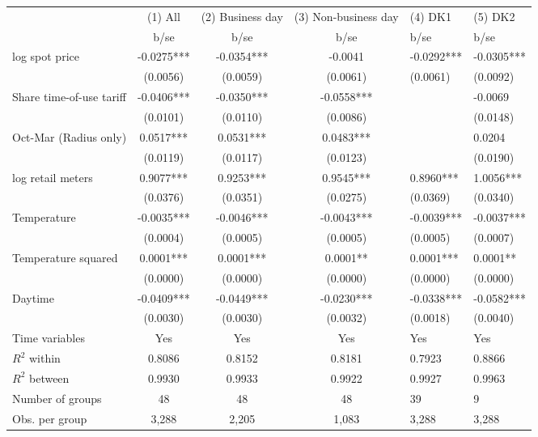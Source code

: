 \begin{tabular}{lccc}\toprule
                    &     (1) All   &(2) Business day   &(3) Non-business day   &     (4) DK1   &     (5) DK2   \\
                    &        b/se   &        b/se   &        b/se   &        b/se   &        b/se   \\
\midrule
log spot price      &     -0.0275***&     -0.0354***&     -0.0041   &     -0.0292***&     -0.0305***\\
                    &    (0.0056)   &    (0.0059)   &    (0.0061)   &    (0.0061)   &    (0.0092)   \\
Share time-of-use tariff&     -0.0406***&     -0.0350***&     -0.0558***&               &     -0.0069   \\
                    &    (0.0101)   &    (0.0110)   &    (0.0086)   &               &    (0.0148)   \\
Oct-Mar (Radius only)&      0.0517***&      0.0531***&      0.0483***&               &      0.0204   \\
                    &    (0.0119)   &    (0.0117)   &    (0.0123)   &               &    (0.0190)   \\
log retail meters   &      0.9077***&      0.9253***&      0.9545***&      0.8960***&      1.0056***\\
                    &    (0.0376)   &    (0.0351)   &    (0.0275)   &    (0.0369)   &    (0.0340)   \\
Temperature         &     -0.0035***&     -0.0046***&     -0.0043***&     -0.0039***&     -0.0037***\\
                    &    (0.0004)   &    (0.0005)   &    (0.0005)   &    (0.0005)   &    (0.0007)   \\
Temperature squared &      0.0001***&      0.0001***&      0.0001** &      0.0001***&      0.0001** \\
                    &    (0.0000)   &    (0.0000)   &    (0.0000)   &    (0.0000)   &    (0.0000)   \\
Daytime             &     -0.0409***&     -0.0449***&     -0.0230***&     -0.0338***&     -0.0582***\\
                    &    (0.0030)   &    (0.0030)   &    (0.0032)   &    (0.0018)   &    (0.0040)   \\
Time variables      &         Yes   &         Yes   &         Yes   &         Yes   &         Yes   \\
\midrule
\(R^2\) within      &      0.8086   &      0.8152   &      0.8181   &      0.7923   &      0.8866   \\
\(R^2\) between     &      0.9930   &      0.9933   &      0.9922   &      0.9927   &      0.9963   \\
Number of groups    &          48   &          48   &          48   &          39   &           9   \\
Obs. per group      &       3,288   &       2,205   &       1,083   &       3,288   &       3,288   \\
\bottomrule\end{tabular}
